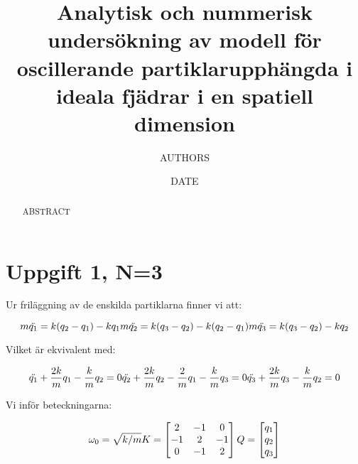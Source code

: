 \documentclass[12pt,a4paper]{article}
\begin{document}

\title{Analytisk och nummerisk undersökning av modell för oscillerande partiklarupphängda i ideala fjädrar i en spatiell dimension}
	\author{AUTHORS}
	\date{DATE}
	\maketitle
	\thispagestyle{empty}

	\begin{abstract}
		ABSTRACT
	\end{abstract}

\newpage

	\tableofcontents
	\thispagestyle{empty}

\newpage

	\setcounter{page}{1}
	\pagestyle{plain}
	
	
\section{Uppgift 1, N=3}
Ur friläggning av de enskilda partiklarna finner vi att:

\begin{equation*}
m\ddot{q_1} = k(q_2-q_1)-kq_1 \\
m\ddot{q_2} = k(q_3-q_2)-k(q_2-q_1) \\
m\ddot{q_3} = k(q_3-q_2)-kq_2
\end{equation*}

Vilket är ekvivalent med:

\begin{equation*}
\ddot{q_1} + \frac{2k}{m}q_1 - \frac{k}{m}q_2 = 0 \\
\ddot{q_2} + \frac{2k}{m}q_2-\frac{2}{m}q_1 - \frac{k}{m}q_3 = 0 \\
\ddot{q_3} + \frac{2k}{m}q_3 - \frac{k}{m}q_2=0
\end{equation*}

Vi inför beteckningarna: 

\begin{equation*}
\omega_0=\sqrt{k/m}
K=
\begin{bmatrix}
2 &-1 &0 \\
 -1 & 2 &-1\\
 0 &-1 &2
\end{bmatrix}\\
Q=
\begin{bmatrix}
q_1 \\ 
q_2 \\
q_3
\end{bmatrix}
\end{equation*}
\end{document}
